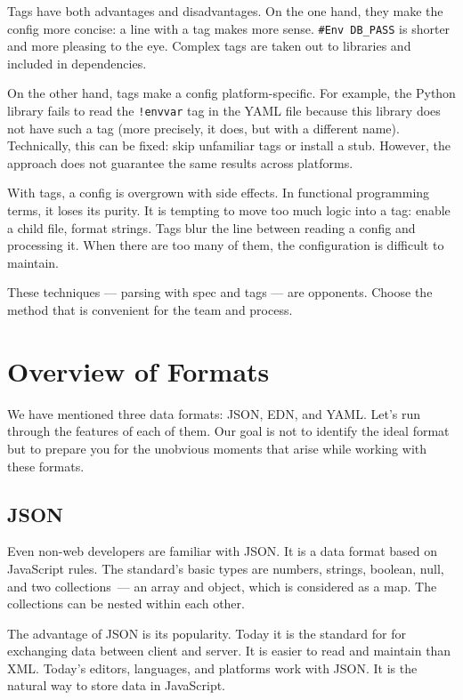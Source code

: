Tags have both advantages and disadvantages. On the one hand, they make the config more concise: a line with a tag makes more sense. \verb|#Env DB_PASS| is shorter and more pleasing to the eye. Complex tags are taken out to libraries and included in dependencies.

On the other hand, tags make a config platform-specific. For example, the Python library fails to read the \verb|!envvar| tag in the YAML file because this library does not have such a tag (more precisely, it does, but with a different name). Technically, this can be fixed: skip unfamiliar tags or install a stub. However, the approach does not guarantee the same results across platforms.

With tags, a config is overgrown with side effects. In functional programming terms, it loses its purity. It is tempting to move too much logic into a tag: enable a child file, format strings. Tags blur the line between reading a config and processing it. When there are too many of them, the configuration is difficult to maintain.

These techniques — parsing with spec and tags — are opponents. Choose the method that is convenient for the team and process.

\section{Overview of Formats}

We have mentioned three data formats: JSON, EDN, and YAML. Let's run through the features of each of them.  Our goal is not to identify the ideal format but to prepare you for the unobvious moments that arise while working with these formats.

\subsection{JSON}


Even non-web developers are familiar with JSON. It is a data format based on JavaScript rules. The standard's basic types are numbers, strings, boolean, null, and two collections~--- an array and object, which is considered as a map. The collections can be nested within each other.


The advantage of JSON is its popularity. Today it is the standard for for exchanging data between client and server.  It is easier to read and maintain than XML. Today's editors, languages, and platforms work with JSON. It is the natural way to store data in JavaScript.

